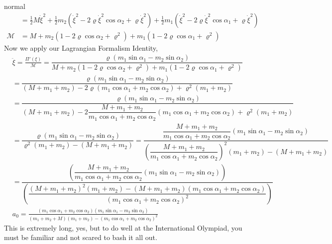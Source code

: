 \begin{solution}{normal}
\begin{align*}
&=\frac{1}{2}M\dot\xi^2+\frac{1}{2}m_2(\dot\xi^2-2\varrho\dot\xi^2\cos\alpha_2+\varrho\dot\xi^2) +\frac{1}{2}m_1(\dot\xi^2-2\varrho\dot\xi^2\cos\alpha_1+\varrho\dot\xi^2)\\
\mathcal{M}&=M+m_2(1-2\varrho\cos\alpha_2+\varrho^2)+m_1(1-2\varrho\cos\alpha_1+\varrho^2)
\end{align*}Now we apply our Lagrangian Formalism Identity,
\begin{align*}
&\ddot\xi=\frac{\Pi'\left(\xi\right)}{\mathcal{M}}=\dfrac{\varrho(m_1\sin\alpha_1-m_2\sin\alpha_2)}{M+m_2(1-2\varrho\cos\alpha_2+\varrho^2)+m_1(1-2\varrho\cos\alpha_1+\varrho^2)}\\
&=\dfrac{\varrho(m_1\sin\alpha_1-m_2\sin\alpha_2)}{(M+m_1+m_2)-2\varrho(m_1\cos\alpha_1+m_2\cos\alpha_2)+\varrho^2(m_1+m_2)}\\
&=\dfrac{\varrho(m_1\sin\alpha_1-m_2\sin\alpha_2)}{(M+m_1+m_2)-2\dfrac{M+m_1+m_2}{m_1\cos\alpha_1+m_2\cos\alpha_2}(m_1\cos\alpha_1+m_2\cos\alpha_2)+\varrho^2(m_1+m_2)}\\
&=\dfrac{\varrho(m_1\sin\alpha_1-m_2\sin\alpha_2)}{\varrho^2(m_1+m_2)-(M+m_1+m_2)}
=\dfrac{\dfrac{M+m_1+m_2}{m_1\cos\alpha_1+m_2\cos\alpha_2}(m_1\sin\alpha_1-m_2\sin\alpha_2)}{\left(\dfrac{M+m_1+m_2}{m_1\cos\alpha_1+m_2\cos\alpha_2}\right)^2(m_1+m_2)-(M+m_1+m_2)}\\
&=\dfrac{\left(\dfrac{M+m_1+m_2}{m_1\cos\alpha_1+m_2\cos\alpha_2}(m_1\sin\alpha_1-m_2\sin\alpha_2)\right)}{\left(\dfrac{(M+m_1+m_2)^2(m_1+m_2)-(M+m_1+m_2)(m_1\cos\alpha_1+m_2\cos\alpha_2)}{(m_1\cos\alpha_1+m_2\cos\alpha_2)^2}\right)}\\
&\boxed{a_0 = \frac{(m_1\cos\alpha_1 + m_2\cos\alpha_2)(m_1\sin\alpha_1 - m_2\sin\alpha_2)}{(m_1+m_2+M)(m_1+m_2) - (m_1\cos\alpha_1+m_2\cos\alpha_2)^2}}
\end{align*}
This is extremely long, yes, but to do well at the International Olympiad, you must be familiar and not scared to bash it all out.
\end{solution}

